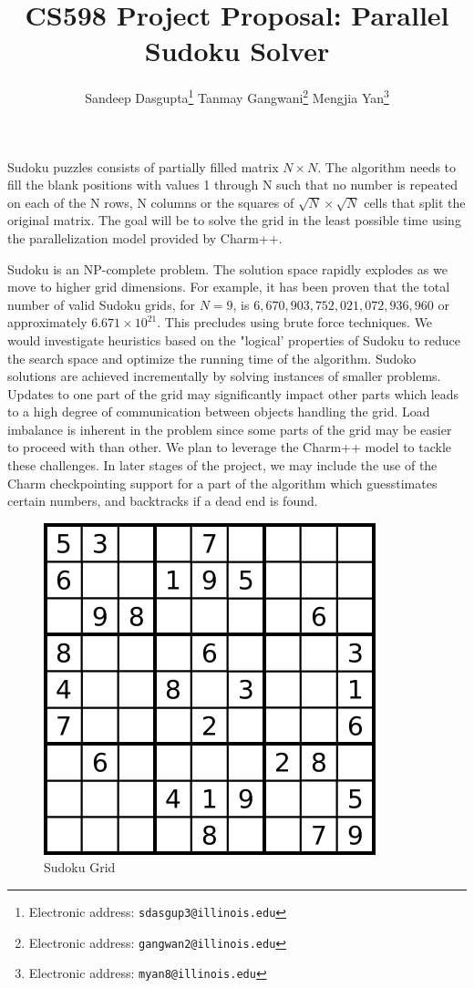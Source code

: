 \documentclass[10pt,twoside]{article}
\title{\textbf{ CS598 Project Proposal: Parallel Sudoku Solver}}
\author{Sandeep Dasgupta\thanks{Electronic address: \texttt{sdasgup3@illinois.edu}}
\qquad Tanmay Gangwani\thanks{Electronic address: \texttt{gangwan2@illinois.edu}}
\qquad  Mengjia Yan\thanks{Electronic address:
\texttt{myan8@illinois.edu}}}
\begin{document}
\thispagestyle{empty}

\maketitle

  Sudoku puzzles consists of partially filled matrix $N \times N$. The algorithm needs
  to fill the blank positions with values 1 through N such that no number is
  repeated on each of the N rows, N columns or the squares of $\sqrt{N} \times
  \sqrt{N} $ cells that split the original matrix.  The goal will be to solve
  the grid in the least possible time using the parallelization model provided by Charm++.

  Sudoku is an NP-complete problem. The solution space rapidly explodes as we move to 
  higher grid dimensions. For example, it has been proven that the total number of
  valid Sudoku grids, for $N = 9$,  is $6,670,903,752,021,072,936,960$ or
  approximately $6.671 \times 10^{21}$. This precludes using brute force techniques. We would 
  investigate heuristics based on the "logical' properties of Sudoku to reduce the search space 
  and optimize the running time of the algorithm. Sudoko solutions are achieved incrementally by 
  solving instances of smaller problems. Updates to one part of the grid may significantly
  impact other parts which leads to a high degree of communication between objects handling the 
  grid. Load imbalance is inherent in the problem since some parts of the grid may be easier to
  proceed with than other. We plan to leverage the Charm++ model to tackle these challenges. In later 
  stages of the project, we may include the use of the Charm checkpointing support for a part of the
  algorithm which guesstimates certain numbers, and backtracks if a dead end is found.

  \begin{figure}[h]
  \centering
    \includegraphics[scale=0.35]{sudoku} 
  \caption{Sudoku Grid} 
  \end{figure}

  




%
\end{document}
